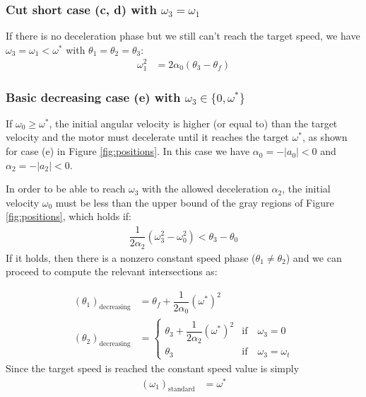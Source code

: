 \documentclass[12pt, a4paper]
{article}
\providecommand{\lr}[1]{\left(#1\right)}
\providecommand{\sub}[1]{_{\text{#1}}}
\providecommand{\w}{\omega}
\providecommand{\wt}{\w^*}
\renewcommand{\th}{\theta}
\renewcommand{\a}{\alpha}
\providecommand{\abs}[1]{\left|#1\right|}
\begin{document}
\subsubsection{Cut short case (c, d) with $\w_3 = \w_1$}
\label{sec:a:cutshortw3isw1}

If there is no deceleration phase but we still can't reach the target speed,
we have $\w_3=\w_1 < \wt$ with $\th_1=\th_2=\th_3$:
%
\begin{align}
    \label{eq:a:cutshortw1}
    \w_1^2  &= 2\a_0\lr{\th_3 - \th_f}
\end{align}

\subsubsection{Basic decreasing case (e)  with $\w_3 \in \{0, \wt\}$}
\label{sec:a:decreasing}
If $\w_0 \geq \wt$, the initial angular velocity is higher (or equal to) than
the target velocity and the motor must decelerate until it reaches the target
$\wt$, as shown for case (e) in Figure \ref{fig:positions}.
In this case we have $\a_0 = -\abs{a_0} < 0$ and $\a_2 = -\abs{a_2} < 0$.

In order to be able to reach $\w_3$ with the allowed deceleration $\a_2$,
the initial velocity $\w_0$ must be less than the upper bound of the
gray regions of Figure \ref{fig:positions}, which holds if:
%
\begin{align}
    \label{eq:a:decreaselimit}
     \dfrac{1}{2 \a_2}\lr{\w_3^2 - \w_0^2} < \th_3 - \th_0
\end{align}
%
If it holds, then there is a nonzero constant speed phase ($\th_1 \neq \th_2$)
and we can proceed to compute the relevant intersections as: 

\begin{align}
    \label{eq:a:t1mt0:decreasing}
    \lr{\th_1}\sub{decreasing} &= \th_f  + \dfrac{1}{2\a_0}(\wt)^2\\[1em]
    \lr{\th_2}\sub{decreasing} &=
        \begin{cases}
        \th_3  + \dfrac{1}{2\a_2}(\wt)^2 & \text{if} \quad \w_3 = 0\\ 
        \th_3 &  \text{if} \quad\w_3 = \w_t
        \end{cases}
\end{align}
%
Since the target speed is reached the constant speed value is simply
\begin{align}
    \lr{\w_1}\sub{standard} &= \wt
\end{align}
\end{document}
